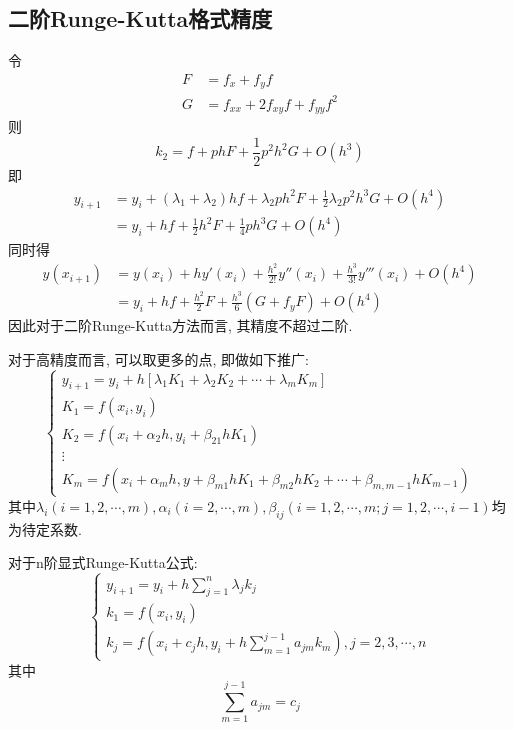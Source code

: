\subsection{二阶Runge-Kutta格式精度}

令
\begin{align*}
    F&=f_x+f_yf\\
    G&=f_{xx}+2f_{xy}f+f_{yy}f^2
\end{align*}
则
\begin{equation*}
    k_2=f+phF+\frac{1}{2}p^2h^2G+O(h^3)
\end{equation*}
即
\begin{align*}
    y_{i+1}&=y_i+(\lambda_1+\lambda_2)hf+\lambda_2ph^2F+\frac{1}{2}\lambda_2p^2h^3G+O(h^4)\\
    &=y_i+hf+\frac{1}{2}h^2F+\frac{1}{4}ph^3G+O(h^4)
\end{align*}
同时得
\begin{align*}
    y(x_{i+1})&=y(x_i)+hy'(x_i)+\frac{h^2}{2!}y''(x_i)+\frac{h^3}{3!}y'''(x_i)+O(h^4)\\
    &=y_i+hf+\frac{h^2}{2}F+\frac{h^3}{6}(G+f_yF)+O(h^4)
\end{align*}
因此对于二阶Runge-Kutta方法而言, 其精度不超过二阶.

对于高精度而言, 可以取更多的点, 即做如下推广:
\begin{equation*}
    \begin{cases}
        y_{i+1}=y_i+h[\lambda_1K_1+\lambda_2K_2+\cdots+\lambda_mK_m]\\
        K_1=f(x_i,y_i)\\
        K_2=f(x_i+\alpha_2h,y_i+\beta_{21}hK_1)\\
        \vdots\\
        K_m=f(x_i+\alpha_mh,y+\beta_{m1}hK_1+\beta_{m2}hK_2+\cdots+\beta_{m,m-1}hK_{m-1})
    \end{cases}
\end{equation*}
其中$\lambda_i(i=1,2,\cdots,m),\alpha_i(i=2,\cdots,m),\beta_{ij}(i=1,2,\cdots,m;j=1,2,\cdots,i-1)$均为待定系数.

对于n阶显式Runge-Kutta公式:
\begin{equation*}
    \begin{cases}
        y_{i+1}=y_i+h\sum_{j=1}^n\lambda_jk_j\\
        k_1=f(x_i,y_i)\\
        k_j=f\left(x_i+c_jh,y_i+h\sum_{m=1}^{j-1}a_{jm}k_m\right), j=2,3,\cdots,n
    \end{cases}
\end{equation*}
其中
\begin{equation*}
    \sum_{m=1}^{j-1}a_{jm}=c_j
\end{equation*}

